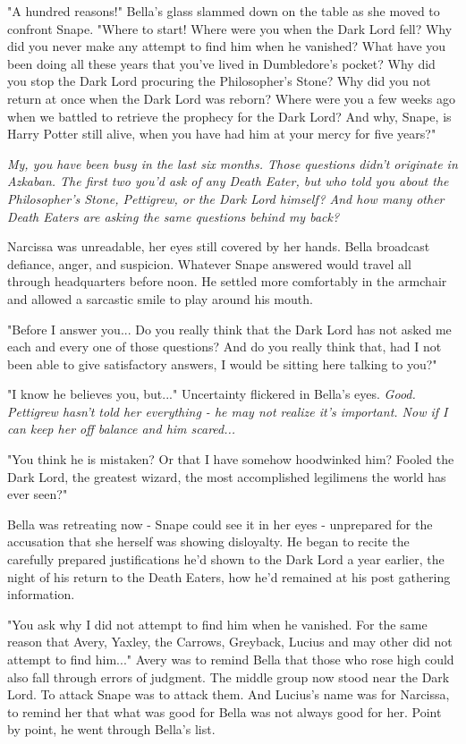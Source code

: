 \documentclass[a4paper,11pt]{article}
\begin{document}
"A hundred reasons!" Bella's glass slammed down on the table as she moved to confront Snape. "Where to start! Where were you when the Dark Lord fell? Why did you never make any attempt to find him when he vanished? What have you been doing all these years that you've lived in Dumbledore's pocket? Why did you stop the Dark Lord procuring the Philosopher's Stone? Why did you not return at once when the Dark Lord was reborn? Where were you a few weeks ago when we battled to retrieve the prophecy for the Dark Lord? And why, Snape, is Harry Potter still alive, when you have had him at your mercy for five years?"

\emph{My, you have been busy in the last six months. Those questions didn't originate in Azkaban. The first two you'd ask of any Death Eater, but who told you about the Philosopher's Stone, Pettigrew, or the Dark Lord himself? And how many other Death Eaters are asking the same questions behind my back?}

Narcissa was unreadable, her eyes still covered by her hands. Bella broadcast defiance, anger, and suspicion. Whatever Snape answered would travel all through headquarters before noon. He settled more comfortably in the armchair and allowed a sarcastic smile to play around his mouth.

"Before I answer you... Do you really think that the Dark Lord has not asked me each and every one of those questions? And do you really think that, had I not been able to give satisfactory answers, I would be sitting here talking to you?"

"I know he believes you, but..." Uncertainty flickered in Bella's eyes. \emph{Good. Pettigrew hasn't told her everything - he may not realize it's important. Now if I can keep her off balance and him scared...}

"You think he is mistaken? Or that I have somehow hoodwinked him? Fooled the Dark Lord, the greatest wizard, the most accomplished legilimens the world has ever seen?"

Bella was retreating now - Snape could see it in her eyes - unprepared for the accusation that she herself was showing disloyalty. He began to recite the carefully prepared justifications he'd shown to the Dark Lord a year earlier, the night of his return to the Death Eaters, how he'd remained at his post gathering information.

"You ask why I did not attempt to find him when he vanished. For the same reason that Avery, Yaxley, the Carrows, Greyback, Lucius and may other did not attempt to find him..." Avery was to remind Bella that those who rose high could also fall through errors of judgment. The middle group now stood near the Dark Lord. To attack Snape was to attack them. And Lucius's name was for Narcissa, to remind her that what was good for Bella was not always good for her. Point by point, he went through Bella's list.
\end{document}
